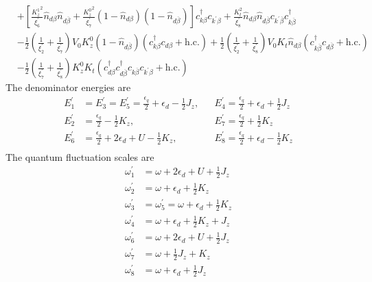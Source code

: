 \documentclass[twoside]{report}
\numberwithin{equation}{section}
\begin{document}
\begin{equation}
\begin{aligned}
&+\left[\frac{{K_z^1}^2}{\xi^\prime_6}\hat n_{d\beta}\hat n_{d\overline\beta} + \frac{{K_z^0}^2}{\xi^\prime_7}\left(1 - \hat n_{d\beta}\right)\left(1 - \hat n_{d\overline\beta}\right)\right]c^\dagger_{k\beta}c_{k^\prime\beta} + \frac{K_t^2}{\xi^\prime_8}\hat n_{d\beta}\hat n_{d\overline\beta}c_{k^\prime\overline\beta}c^\dagger_{k\overline\beta} \\
&- \frac{1}{2}\left(\frac{1}{\xi^\prime_2} + \frac{1}{\xi^\prime_7}\right)V_0 K_z^0\left(1 - \hat n_{d\overline\beta}\right)\left(c^\dagger_{k\beta}c_{d\beta} + \text{h.c.}\right) + \frac{1}{2}\left(\frac{1}{\xi^\prime_2} + \frac{1}{\xi^\prime_8}\right)V_0 K_t\hat n_{d\beta}\left(c^\dagger_{k\overline\beta}c_{d\overline\beta} + \text{h.c.}\right) \\
&- \frac{1}{2}\left(\frac{1}{\xi^\prime_7} + \frac{1}{\xi^\prime_8}\right)K_z^0 K_t\left(c^\dagger_{d\beta}c^\dagger_{d\overline\beta}c_{k\overline\beta}c_{k^\prime\beta} + \text{h.c.}\right) 
\end{aligned}\end{equation}
The denominator energies are
\begin{equation}\begin{aligned}
	E_1^\prime &= E_3^\prime = E_5^\prime = \frac{\epsilon_q}{2} + \epsilon_d - \frac{1}{2}J_z, &&E_4^\prime = \frac{\epsilon_q}{2} + \epsilon_d + \frac{1}{2}J_z\\
	E_2^\prime &= \frac{\epsilon_q}{2} - \frac{1}{2}K_z, &&E_7^\prime = \frac{\epsilon_q}{2} + \frac{1}{2}K_z\\
	E_6^\prime &= \frac{\epsilon_q}{2} + 2\epsilon_d + U - \frac{1}{2}K_z, &&E_8^\prime = \frac{\epsilon_q}{2} + \epsilon_d - \frac{1}{2}K_z\\
\end{aligned}\end{equation}
The quantum fluctuation scales are
\begin{equation}\begin{aligned}
	\omega_1^\prime&=\omega+2\epsilon_d+U+\frac{1}{2}J_z\\
	\omega_2^\prime&=\omega+\epsilon_d+\frac{1}{2}K_z \\
	\omega_3^\prime&=\omega_5^\prime=\omega+\epsilon_d + \frac{1}{2}K_z\\
	\omega_4^\prime&=\omega+\epsilon_d+\frac{1}{2}K_z + J_z \\
	\omega_6^\prime&=\omega+2\epsilon_d+U+\frac{1}{2}J_z\\
	\omega_7^\prime&=\omega+\frac{1}{2}J_z + K_z\\
	\omega_8^\prime &=\omega+\epsilon_d+\frac{1}{2}J_z \\
\end{aligned}\end{equation}
\end{document}
